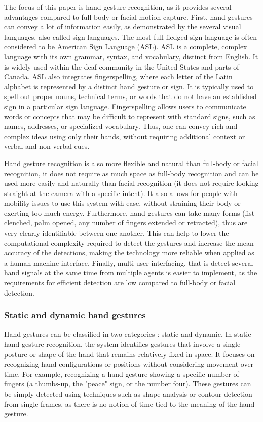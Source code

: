 \documentclass[12pt]{article}
\begin{document}
The focus of this paper is hand gesture recognition, as it provides several advantages compared to full-body or facial motion capture. First, hand gestures can convey a lot of information easily, as demonstrated by the several visual languages, also called sign languages. The most full-fledged sign language is often considered to be American Sign Language (ASL). ASL is a complete, complex language with its own grammar, syntax, and vocabulary, distinct from English. It is widely used within the deaf community in the United States and parts of Canada.
ASL also integrates fingerspelling, where each letter of the Latin alphabet is represented by a distinct hand gesture or sign. It is typically used to spell out proper nouns, technical terms, or words that do not have an established sign in a particular sign language. Fingerspelling allows users to communicate words or concepts that may be difficult to represent with standard signs, such as names, addresses, or specialized vocabulary. Thus, one can convey rich and complex ideas using only their hands, without requiring additional context or verbal and non-verbal cues.

Hand gesture recognition is also more flexible and natural than full-body or facial recognition, it does not require as much space as full-body recognition and can be used more easily and naturally than facial recognition (it does not require looking straight at the camera with a specific intent). It also allows for people with mobility issues to use this system with ease, without straining their body or exerting too much energy.
Furthermore, hand gestures can take many forms (fist clenched, palm opened, any number of fingers extended or retracted), thus are very clearly identifiable between one another. This can help to lower the computational complexity required to detect the gestures and increase the mean accuracy of the detections, making the technology more reliable when applied as a human-machine interface. Finally, multi-user interfacing, that is detect several hand signals at the same time from multiple agents is easier to implement, as the requirements for efficient detection are low compared to full-body or facial detection. 

\subsubsection{Static and dynamic hand gestures}

Hand gestures can be classified in two categories : static and dynamic.
In static hand gesture recognition, the system identifies gestures that involve a single posture or shape of the hand that remains relatively fixed in space. It focuses on recognizing hand configurations or positions without considering movement over time. For example, recognizing a hand gesture showing a specific number of fingers (a thumbs-up, the "peace" sign, or the number four). These gestures can be simply detected using techniques such as shape analysis or contour detection from single frames, as there is no notion of time tied to the meaning of the hand gesture.
\end{document}
